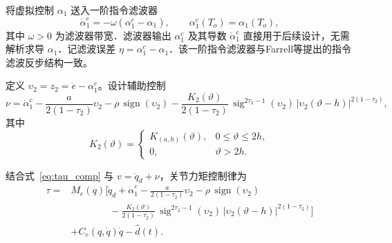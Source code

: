 \documentclass[12pt,a4paper]{article}
\theoremstyle{definition}
\theoremstyle{remark}
\newcommand{\sign}{\operatorname{sign}}
\newcommand{\sig}{\operatorname{sig}}
\newcommand{\vi}{\upsilon}
\newcommand{\vth}{\vartheta}
\begin{document}

将虚拟控制 $\alpha_1$ 送入一阶指令滤波器
\begin{equation}\label{eq:filter}
  \dot\alpha_1^c=-\omega(\alpha_1^c-\alpha_1),\qquad \alpha_1^c(T_o)=\alpha_1(T_o),
\end{equation}
其中 $\omega>0$ 为滤波器带宽．滤波器输出 $\alpha_1^c$ 及其导数 $\dot\alpha_1^c$ 直接用于后续设计，无需解析求导 $\alpha_1$．记滤波误差 $\eta=\alpha_1^c-\alpha_1$．该一阶指令滤波器与Farrell等\cite{farrell2009}提出的指令滤波反步结构一致。


定义 $\vi_2=z_2=\dot e-\alpha_1^c$。设计辅助控制
\begin{equation}\label{eq:nu}
  \nu=\dot\alpha_1^c-\frac{a}{2(1-\tau_2)}\vi_2-\rho\,\sign(\vi_2)
      -\frac{K_2(\vth)}{2(1-\tau_2)}\,\sig^{2\tau_2-1}(\vi_2)\,
      \big|\vi_2(\vth-h)\big|^{2(1-\tau_2)},
\end{equation}
其中
\begin{equation}\label{eq:K2}
  K_2(\vth)=
  \begin{cases}
    K_{(a,h)}(\vth), & 0\le\vth\le 2h,\\[2pt]
    0, & \vth>2h .
  \end{cases}
\end{equation}


结合式~\eqref{eq:tau_comp} 与 $v=\ddot q_d+\nu$，关节力矩控制律为
\begin{equation}\label{eq:tau_final}
  \boxed{
  \begin{aligned}
    \tau
    ={}& M_e(q)\Big[\ddot q_d+\dot\alpha_1^c-\tfrac{a}{2(1-\tau_2)}\vi_2
          -\rho\,\sign(\vi_2) \\
        &\qquad\qquad -\tfrac{K_2(\vth)}{2(1-\tau_2)}\,
          \sig^{2\tau_2-1}(\vi_2)\,\big|\vi_2(\vth-h)\big|^{2(1-\tau_2)}\Big]\\
        &+C_e(q,\dot q)\dot q-\hat d(t) .
  \end{aligned}}
\end{equation}
\end{document}
